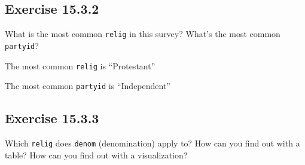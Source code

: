 \documentclass[]{book}
\newenvironment{Shaded}{\begin{snugshade}}{\end{snugshade}}
\newcommand{\CommentTok}[1]{\textcolor[rgb]{0.56,0.35,0.01}{\textit{#1}}}
\newcommand{\DecValTok}[1]{\textcolor[rgb]{0.00,0.00,0.81}{#1}}
\newcommand{\KeywordTok}[1]{\textcolor[rgb]{0.13,0.29,0.53}{\textbf{#1}}}
\newcommand{\NormalTok}[1]{#1}
\newcommand{\OperatorTok}[1]{\textcolor[rgb]{0.81,0.36,0.00}{\textbf{#1}}}
\newcommand{\StringTok}[1]{\textcolor[rgb]{0.31,0.60,0.02}{#1}}
\theoremstyle{plain}
\theoremstyle{remark}
\begin{document}
\hypertarget{exercise-15.3.2}{%
\subsection*{\texorpdfstring{Exercise
{15.3.2}}{Exercise 15.3.2}}\label{exercise-15.3.2}}

What is the most common \texttt{relig} in this survey? What's the most
common \texttt{partyid}?

The most common \texttt{relig} is ``Protestant''

\begin{Shaded}
\end{Shaded}

The most common \texttt{partyid} is ``Independent''

\begin{Shaded}
\end{Shaded}

\hypertarget{exercise-15.3.3}{%
\subsection*{\texorpdfstring{Exercise
{15.3.3}}{Exercise 15.3.3}}\label{exercise-15.3.3}}

Which \texttt{relig} does \texttt{denom} (denomination) apply to? How
can you find out with a table? How can you find out with a
visualization?
\end{document}
